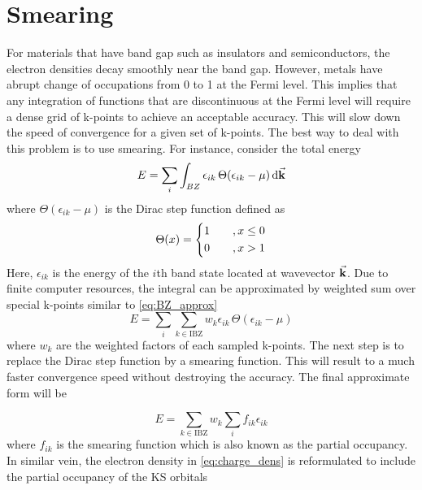 \section{Smearing}
For materials that have band gap such as insulators and semiconductors, the electron densities decay smoothly near the band gap. However, metals have abrupt change of occupations from 0 to 1 at the Fermi level. This implies that any integration of functions that are discontinuous at the Fermi level will require a dense grid of k-points to achieve an acceptable accuracy. This will slow down the speed of convergence for a given set of k-points. The best way to deal with this problem is to use smearing. For instance, consider the total energy 
\begin{equation}
 E = \sum_{i} \int_{BZ} \epsilon_{ik}\, \Theta(\epsilon_{ik} - \mu) \dd{\va{k}}
\end{equation}
where $\Theta(\epsilon_{ik} - \mu)$ is the Dirac step function defined as 
\begin{equation}
    \Theta(x)= 
    \begin{dcases}
        1   \quad &, x \leq 0 \\
        0 &, x > 1 \\
    \end{dcases}
\end{equation}
Here, $\epsilon_{ik}$ is the energy of the $i$th band state located at wavevector $\va{k}$. Due to finite computer resources, the integral can be approximated by weighted sum over special k-points similar to \eqref{eq:BZ_approx}
\begin{equation}
    E = \sum_{i} \sum_{k \in \text{IBZ}} w_k \epsilon_{ik} \, \Theta(\epsilon_{ik} - \mu)
\end{equation}
where $w_k$ are the weighted factors of each sampled k-points. The next step is to replace the Dirac step function by a smearing  function. This will result to a much faster convergence speed without destroying the accuracy. The final approximate form will be

\begin{equation}
    E =  \sum_{k \in \text{IBZ}} w_k \sum_{i} f_{ik} \epsilon_{ik}
\end{equation}
where $f_{ik}$ is the smearing function which is also known as the partial occupancy. In similar vein, the electron density in 
\eqref{eq:charge_dens} is reformulated to include the partial occupancy of the KS orbitals 
 
